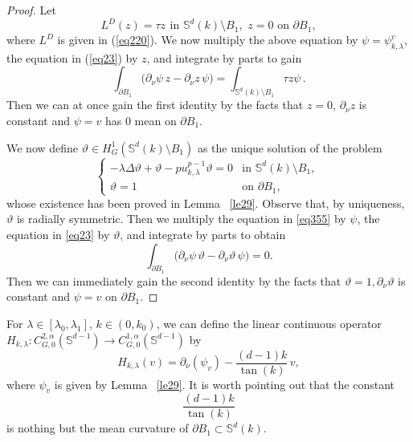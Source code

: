 \documentclass[reqno]{amsart}
\def\Sk{\mathbb{S}^{d}(k)}
\numberwithin{equation}{section}
\newenvironment{key words}{\textbf{Keywords}\mbox{  }}{ }
\begin{document}
\begin{proof} {Let
\[L^{D}(z)=\tau z \,\ \mbox{in $\mathbb{S}^{d}(k)\setminus B_{1}$}, \,\, z=0 \,\, \mbox{on $\partial B_1$},\]
where $L^{D}$ is given in (\ref{eq220}). We now multiply the above equation by $\psi=\psi_{k, \lambda}^v ,$} the equation in (\ref{eq23}) by $z$, and
integrate by parts to gain
\[\int_{\partial B_1}\Big(\partial_{\nu} \psi \, z -\partial_{\nu} z \, \psi \Big)=\int_{\mathbb{S}^{d}(k)\setminus B_{1}}\tau z \psi \,.\]
Then we can at once gain the first identity by the facts that $z=0$, $\partial_{\nu} z$ is constant and $\psi= v$ has $0$ mean on $\partial B_1$.

\medskip

We now define $\vartheta\in H_{G}^{1}(\mathbb{S}^{d}(k)\setminus B_{1})$ as the unique solution of the problem
\begin{equation}\label{eq355}
     \begin{cases}
     -\lambda\Delta\vartheta+\vartheta-pu_{k,\lambda}^{p-1}\vartheta=0 &\mbox{in $\mathbb{S}^{d}(k)\setminus B_{1}$, }\\
      \vartheta=1 &\mbox{on $\partial B_1$,}
      \end{cases}
    \end{equation}
whose existence has been proved in Lemma ~\ref{le29}. Observe that, by uniqueness, $\vartheta$ is radially symmetric. Then we multiply the equation in \eqref{eq355} by $\psi$, the equation in \eqref{eq23} by $\vartheta$, and integrate by parts to obtain
\[\int_{\partial B_{1}}\Big(\partial_{\nu} \psi \, \vartheta-\partial_{\nu} \vartheta \,  \psi \Big)=0.\]
Then we can immediately gain the second identity by the facts that $\vartheta=1, \partial_{\nu} \vartheta$ is constant and $\psi= v$ on $\partial B_1$.
\end{proof}

\medskip

For $\lambda\in[\lambda_{0},\lambda_{1}]$, $k \in (0, k_0)$, we can define the linear continuous operator $H_{k,\lambda}:C^{2,\alpha}_{G,0}(\mathbb{S}^{d-1})\rightarrow C_{G,0}^{1,\alpha}(\mathbb{S}^{d-1})$ by
\begin{equation}\label{eq36}
H_{k, \lambda}(v) =  \partial_{\nu} (\psi_v) -\frac{(d-1)k}{\tan(k)} \, v,
\end{equation}
where $\psi_v$ is given by Lemma ~\ref{le29}. It is worth pointing out that the constant $$\frac{(d-1)k}{\tan(k)}$$ is nothing but the mean curvature of $\partial B_1 \subset \Sk$.
\end{document}
